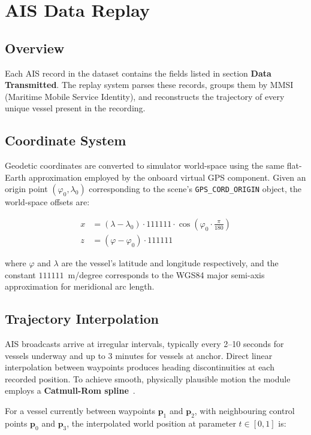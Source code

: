 \section{AIS Data Replay}

\subsection{Overview}


Each AIS record in the dataset contains the fields listed in section \textbf{Data Transmitted}. The replay system parses these records, groups them by MMSI (Maritime Mobile Service Identity), and reconstructs the trajectory of every unique vessel present in the recording.


\subsection{Coordinate System}

Geodetic coordinates are converted to simulator world-space using the same flat-Earth approximation employed by the onboard virtual GPS component. Given an origin point $(\varphi_0, \lambda_0)$ corresponding to the scene's \texttt{GPS\_CORD\_ORIGIN} object, the world-space offsets are:

\begin{align}
    x &= (\lambda - \lambda_0) \cdot 111111 \cdot \cos\!\left(\varphi_0 \cdot \frac{\pi}{180}\right) \\
    z &= (\varphi - \varphi_0) \cdot 111111
\end{align}

\noindent where $\varphi$ and $\lambda$ are the vessel's latitude and longitude respectively, and the constant $111111$~m/degree corresponds to the WGS84 major semi-axis approximation for meridional arc length.

\subsection{Trajectory Interpolation}

AIS broadcasts arrive at irregular intervals, typically every 2--10 seconds for vessels underway and up to 3 minutes for vessels at anchor. Direct linear interpolation between waypoints produces heading discontinuities at each recorded position. To achieve smooth, physically plausible motion the module employs a \textbf{Catmull-Rom spline}~\cite{catmullrom1974}.

For a vessel currently between waypoints $\mathbf{p}_1$ and $\mathbf{p}_2$, with neighbouring control points $\mathbf{p}_0$ and $\mathbf{p}_3$, the interpolated world position at parameter $t \in [0,1]$ is:

